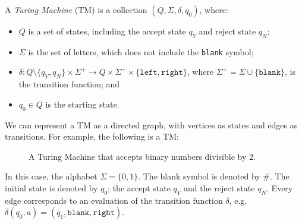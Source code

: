 A \emph{Turing Machine} (TM) is a collection $(Q, \Sigma, \delta, q_0)$, where:
\begin{itemize}
    \item $Q$ is a set of states, including the accept state $q_Y$ and reject state $q_N$;
    \item $\Sigma$ is the set of letters, which does not include the \texttt{blank} symbol;
    \item $\delta \colon Q \setminus \{q_Y, q_N\} \times \Sigma^+ \to Q \times \Sigma^+ \times \{\texttt{left}, \texttt{right}\}$, where $\Sigma^+ = \Sigma \cup \{\texttt{blank}\}$, is the transition function; and
    \item $q_0 \in Q$ is the starting state.
\end{itemize}
We can represent a TM as a directed graph, with vertices as states and edges as transitions. For example, the following is a TM:
\begin{figure}[H]
    \centering
    \caption{A Turing Machine that accepts binary numbers divisible by 2.}
\end{figure}
\noindent In this case, the alphabet $\Sigma = \{0, 1\}$. The blank symbol is denoted by $\#$. The initial state is denoted by $q_0$; the accept state $q_Y$ and the reject state $q_N$. Every edge corresponds to an evaluation of the transition function $\delta$, e.g. $\delta(q_0, a) = (q_1, \texttt{blank}, \texttt{right})$.

